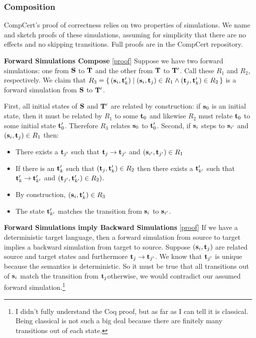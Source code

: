 \subsubsection{Composition}
CompCert's proof of correctness relies on two properties of simulations.
We name and sketch proofs of these simulations, assuming for simplicity that there are no effects and no skipping transitions.
Full proofs are in the CompCert repository.

\textbf{Forward Simulations Compose} [\href{https://github.com/AbsInt/CompCert/blob/master/common/Smallstep.v#L798}{proof}] \quad
 Suppose we have two forward simulations: one from $\mathbf{S}$ to $\mathbf{T}$ and the other from $\mathbf{T}$ to $\mathbf{T}'$.
Call these $R_1$ and $R_2$, respectively.
We claim that $R_3 = \{\,(\mathbf{s}_i, \mathbf{t}'_k) \mid (\mathbf{s}_i, \mathbf{t}_j) \in R_1 \wedge (\mathbf{t}_j, \mathbf{t}'_k) \in R_2\,\}$ is a forward simulation from $\mathbf{S}$ to $\mathbf{T}'$.

First, all initial states of $\mathbf{S}$ and $\mathbf{T}'$ are related by construction: if $\mathbf{s}_0$ is an initial state, then it must be related by $R_1$ to some $\mathbf{t}_0$ and likewise $R_2$ must relate $\mathbf{t}_0$ to some initial state $\mathbf{t}'_0$.
Therefore $R_3$ relates $\mathbf{s}_0$ to $\mathbf{t}'_0$.
Second, if $\mathbf{s}_i$ steps to $\mathbf{s}_{i'}$ and $(\mathbf{s}_i, \mathbf{t}_j) \in R_1$ then:
\begin{itemize}
\item There exists a $\mathbf{t}_{j'}$ such that $\mathbf{t}_{j} \rightarrow \mathbf{t}_{j'}$ and $(\mathbf{s}_{i'}, \mathbf{t}_{j'}) \in R_1$
\item If there is an $\mathbf{t}'_{k}$ such that $(\mathbf{t}_j, \mathbf{t}'_k) \in R_2$ then there exists a $\mathbf{t}'_{k'}$ such that $\mathbf{t}'_k \rightarrow \mathbf{t}'_{k'}$ and $(\mathbf{t}_{j'}, \mathbf{t}'_{k'}) \in R_2)$.
\item By construction, $(\mathbf{s}_i, \mathbf{t}'_k) \in R_3$
\item The state $\mathbf{t}'_{k'}$ matches the transition from $\mathbf{s}_i$ to $\mathbf{s}_{i'}$.
\end{itemize}

\textbf{Forward Simulations imply Backward Simulations} [\href{https://github.com/AbsInt/CompCert/blob/master/common/Smallstep.v#L1481}{proof}] \quad
 If we have a deterministic target language, then a forward simulation from source to target implies a backward simulation from target to source.
Suppose $(\mathbf{s}_i, \mathbf{t}_j)$ are related source and target states and furthermore $\mathbf{t}_j \rightarrow \mathbf{t}_{j'}$.
We know that $\mathbf{t}_{j'}$ is unique because the semantics is deterministic.
So it must be true that all transitions out of $\mathbf{s}_i$ match the transition from $\mathbf{t}_j$\textemdash otherwise, we would contradict our assumed forward simulation.\footnote{I didn't fully understand the Coq proof, but as far as I can tell it is classical. Being classical is not such a big deal because there are finitely many transitions out of each state.}


